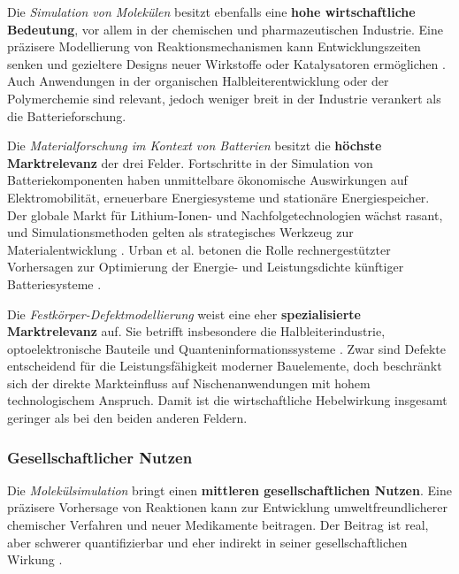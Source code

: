 Die \textit{Simulation von Molekülen} besitzt ebenfalls eine \textbf{hohe wirtschaftliche Bedeutung}, vor allem in der chemischen und pharmazeutischen Industrie. Eine präzisere Modellierung von Reaktionsmechanismen kann Entwicklungszeiten senken und gezieltere Designs neuer Wirkstoffe oder Katalysatoren ermöglichen \cite{mcardle2020quantum}. Auch Anwendungen in der organischen Halbleiterentwicklung oder der Polymerchemie sind relevant, jedoch weniger breit in der Industrie verankert als die Batterieforschung.

\vspace{0.5em}

Die \textit{Materialforschung im Kontext von Batterien} besitzt die \textbf{höchste Marktrelevanz} der drei Felder. Fortschritte in der Simulation von Batteriekomponenten haben unmittelbare ökonomische Auswirkungen auf Elektromobilität, erneuerbare Energiesysteme und stationäre Energiespeicher. Der globale Markt für Lithium-Ionen- und Nachfolgetechnologien wächst rasant, und Simulationsmethoden gelten als strategisches Werkzeug zur Materialentwicklung \cite{demir2024application}. Urban et al. betonen die Rolle rechnergestützter Vorhersagen zur Optimierung der Energie- und Leistungsdichte künftiger Batteriesysteme \cite{urban2016computational}.

\vspace{0.5em}

Die \textit{Festkörper-Defektmodellierung} weist eine eher \textbf{spezialisierte Marktrelevanz} auf. Sie betrifft insbesondere die Halbleiterindustrie, optoelektronische Bauteile und Quanteninformationssysteme \cite{bassett2019defect}. Zwar sind Defekte entscheidend für die Leistungsfähigkeit moderner Bauelemente, doch beschränkt sich der direkte Markteinfluss auf Nischenanwendungen mit hohem technologischem Anspruch. Damit ist die wirtschaftliche Hebelwirkung insgesamt geringer als bei den beiden anderen Feldern.



\subsubsection{Gesellschaftlicher Nutzen}

Die \textit{Molekülsimulation} bringt einen \textbf{mittleren gesellschaftlichen Nutzen}. Eine präzisere Vorhersage von Reaktionen kann zur Entwicklung umweltfreundlicherer chemischer Verfahren und neuer Medikamente beitragen. Der Beitrag ist real, aber schwerer quantifizierbar und eher indirekt in seiner gesellschaftlichen Wirkung \cite{mcardle2020quantum}.

